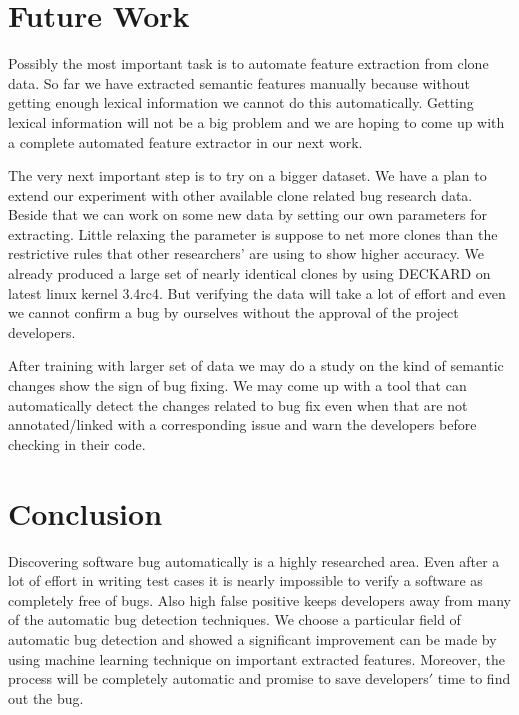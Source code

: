 \documentclass[nocopyrightspace]{sigplanconf}
\begin{document}
\section{Future Work}
Possibly the most important task is to automate feature extraction from clone data. So far we have extracted semantic features manually because without getting enough lexical information we cannot do this automatically. Getting lexical information will not be a big problem and we are hoping to come up with a complete automated feature extractor in our next work.

The very next important step is to try on a bigger dataset. We have a plan to extend our experiment with other available clone related bug research data. Beside that we can work on some new data by setting our own parameters for extracting. Little relaxing the parameter is suppose to net more clones than the restrictive rules that other researchers' are using to show higher accuracy. We already produced a large set of nearly identical clones by using DECKARD on latest linux kernel 3.4rc4. But verifying the data will take a lot of effort and even we cannot confirm a bug by ourselves without the approval of the project developers.

After training with larger set of data we may do a study on the kind of semantic changes show the sign of bug fixing. We may come up with a tool that can automatically detect the changes related to bug fix even when that are not annotated/linked with a corresponding issue and warn the developers before checking in their code.

\section{Conclusion}
Discovering software bug automatically is a highly researched area. Even after a lot of effort in writing test cases it is nearly impossible to verify a software as completely free of bugs. Also high false positive keeps developers away from many of the automatic bug detection techniques. We choose a particular field of automatic bug detection and showed a significant improvement can be made by using machine learning technique on important extracted features. Moreover, the process will be completely automatic and promise to save developers$'$ time to find out the bug.



\end{document}
